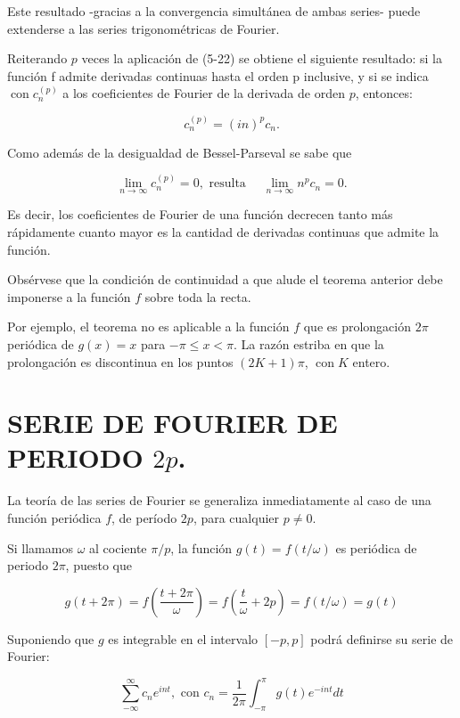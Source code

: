 \documentclass[10pt]{article}
\theoremstyle{plain}
\theoremstyle{definition}
\theoremstyle{remark}
\begin{document}
Este resultado -gracias a la convergencia simultánea de ambas series- puede extenderse a las series trigonométricas de Fourier.

Reiterando $p$ veces la aplicación de (5-22) se obtiene el siguiente resultado: si la función f admite derivadas continuas hasta el orden p inclusive, y si se indica $\operatorname{con} c_{n}^{(p)}$ a los coeficientes de Fourier de la derivada de orden $p$, entonces:


\begin{equation*}
c_{n}^{(p)}=(i n)^{p} c_{n} . \tag{5-23}
\end{equation*}


Como además de la desigualdad de Bessel-Parseval se sabe que


\begin{equation*}
\lim _{n \rightarrow \infty} c_{n}^{(p)}=0, \text { resulta } \quad \lim _{n \rightarrow \infty} n^{p} c_{n}=0 . \tag{5-24}
\end{equation*}


Es decir, los coeficientes de Fourier de una función decrecen tanto más rápidamente cuanto mayor es la cantidad de derivadas continuas que admite la función.

Obsérvese que la condición de continuidad a que alude el teorema anterior debe imponerse a la función $f$ sobre toda la recta.

Por ejemplo, el teorema no es aplicable a la función $f$ que es prolongación $2 \pi$ periódica de $g(x)=x$ para $-\pi \leqslant x<\pi$. La razón estriba en que la prolongación es discontinua en los puntos $(2 K+1) \pi$, $\operatorname{con} K$ entero.

\section*{SERIE DE FOURIER DE PERIODO $2 p$.}
La teoría de las series de Fourier se generaliza inmediatamente al caso de una función periódica $f$, de período $2 p$, para cualquier $p \neq 0$.

Si llamamos $\omega$ al cociente $\pi / p$, la función $g(t)=f(t / \omega)$ es periódica de periodo $2 \pi$, puesto que

$$
g(t+2 \pi)=f\left(\frac{t+2 \pi}{\omega}\right)=f\left(\frac{t}{\omega}+2 p\right)=f(t / \omega)=g(t)
$$

Suponiendo que $g$ es integrable en el intervalo $[-p, p]$ podrá definirse su serie de Fourier:

$$
\sum_{-\infty}^{\infty} c_{n} e^{i n t}, \text { con } c_{n}=\frac{1}{2 \pi} \int_{-\pi}^{\pi} g(t) e^{-i n t} d t
$$
\end{document}
